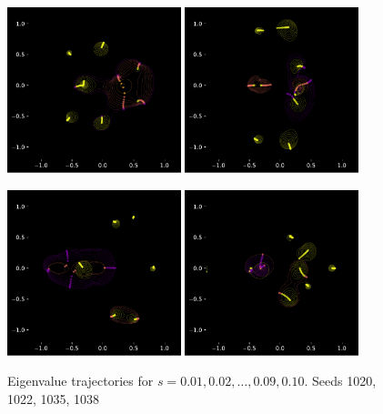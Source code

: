 \documentclass{article}
\begin{document}
	\newpage

	\begin{figure}[htbp]
		\centering
		\includegraphics[width=0.45\textwidth]{figures/initial_frame1020.pdf}
		\includegraphics[width=0.45\textwidth]{figures/initial_frame1022.pdf}

		\includegraphics[width=0.45\textwidth]{figures/initial_frame1035.pdf}
		\includegraphics[width=0.45\textwidth]{figures/initial_frame1038.pdf}
		\caption{Eigenvalue trajectories for $s= 0.01, 0.02, \dots , 0.09, 0.10$. Seeds 1020, 1022, 1035, 1038}

		\label{fig:pdf_image}
 	\end{figure}
\end{document}
